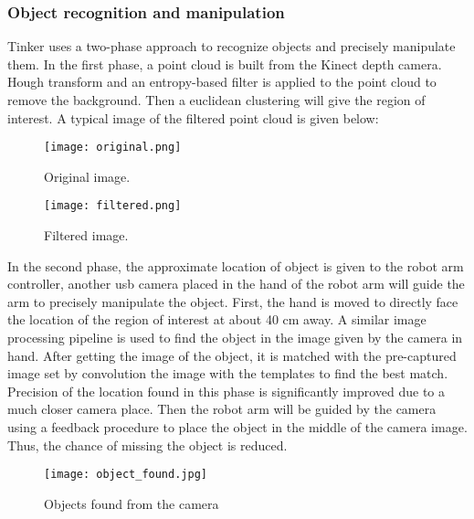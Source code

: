 \subsubsection{Object recognition and manipulation}
Tinker uses a two-phase approach to recognize objects and precisely manipulate them. In the first phase, a point cloud is built from the Kinect depth camera. Hough transform and an entropy-based filter is applied to the point cloud to remove the background. Then a euclidean clustering will give the region of interest. A typical image of the filtered point cloud is given below:
\begin{figure}[!t]
	\centering
    \texttt{[image: original.png]}
    \caption{Original image.}
\end{figure}

\begin{figure}[!t]
	\centering
    \texttt{[image: filtered.png]}
    \caption{Filtered image.}
\end{figure}

In the second phase, the approximate location of object is given to the robot arm controller, another usb camera placed in the hand of the robot arm will guide the arm to precisely manipulate the object. First, the hand is moved to directly face the location of the region of interest at about 40 cm away. A similar image processing pipeline is used to find the object in the image given by the camera in hand. After getting the image of the object, it is matched with the pre-captured image set by convolution the image with the templates to find the best match. Precision of the location found in this phase is significantly improved due to a much closer camera place. Then the robot arm will be guided by the camera using a feedback procedure to place the object in the middle of the camera image. Thus, the chance of missing the object is reduced.

\begin{figure}[!t]
	\centering
    \texttt{[image: object\_found.jpg]}
    \caption{Objects found from the camera}
\end{figure}
